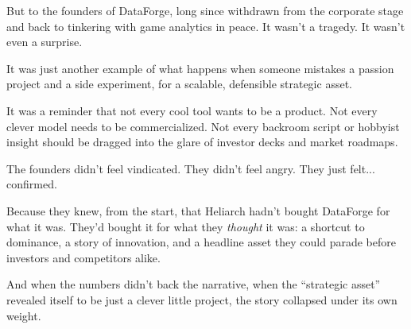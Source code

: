 \medskip

But to the founders of DataForge, long since withdrawn from the corporate stage and back to tinkering with 
game analytics in peace. It wasn’t a tragedy.  It wasn’t even a surprise.

It was just another example of what happens when someone mistakes a passion project and a side experiment,
for a scalable, defensible strategic asset.

It was a reminder that not every cool tool wants to be a product.
Not every clever model needs to be commercialized.
Not every backroom script or hobbyist insight should be dragged into the glare of investor decks and market roadmaps.

The founders didn’t feel vindicated.
They didn’t feel angry.
They just felt... confirmed.

Because they knew, from the start, that Heliarch hadn’t bought DataForge for what it was.
They’d bought it for what they \textit{thought} it was:
a shortcut to dominance, a story of innovation, and a headline asset they could parade before 
investors and competitors alike.

And when the numbers didn’t back the narrative,
when the ``strategic asset'' revealed itself to be just a clever little project,
the story collapsed under its own weight.

\medskip

